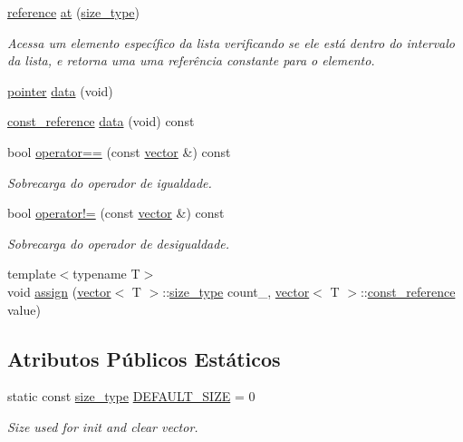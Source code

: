 \begin{DoxyCompactItemize}
\hyperlink{classsc_1_1vector_a37394c8a6b82c4a0709737d7982e32b2}{reference} \hyperlink{classsc_1_1vector_ae3f1a60bf1dac7bdf96b78e708d6e2ca}{at} (\hyperlink{classsc_1_1vector_a48bf37ba1a6d0c13504414d86e27c399}{size\+\_\+type})
\begin{DoxyCompactList}\small\item\em Acessa um elemento específico da lista verificando se ele está dentro do intervalo da lista, e retorna uma uma referência constante para o elemento. \end{DoxyCompactList}\item 
\hyperlink{classsc_1_1vector_a0348a6e1e249e051964a2bc94b05527a}{pointer} \hyperlink{classsc_1_1vector_a8c08600b61d36dd7f76c93f199fbf142}{data} (void)
\item 
\hyperlink{classsc_1_1vector_a8da2b1a11b069241100f9b2e14f481a0}{const\+\_\+reference} \hyperlink{classsc_1_1vector_a91112807482b4d0f6e13096063263eb5}{data} (void) const
\item 
bool \hyperlink{classsc_1_1vector_a14470a2d43b26c15f0f7aaeeb6ae4f04}{operator==} (const \hyperlink{classsc_1_1vector}{vector} \&) const
\begin{DoxyCompactList}\small\item\em Sobrecarga do operador de igualdade. \end{DoxyCompactList}\item 
bool \hyperlink{classsc_1_1vector_a9cf88e668b52a2a00961378d60812064}{operator!=} (const \hyperlink{classsc_1_1vector}{vector} \&) const
\begin{DoxyCompactList}\small\item\em Sobrecarga do operador de desigualdade. \end{DoxyCompactList}\item 
{\footnotesize template$<$typename T$>$ }\\void \hyperlink{classsc_1_1vector_a67d141f57f019a2ad15fa39b90369910}{assign} (\hyperlink{classsc_1_1vector}{vector}$<$ T $>$\+::\hyperlink{classsc_1_1vector_a48bf37ba1a6d0c13504414d86e27c399}{size\+\_\+type} count\+\_\+, \hyperlink{classsc_1_1vector}{vector}$<$ T $>$\+::\hyperlink{classsc_1_1vector_a8da2b1a11b069241100f9b2e14f481a0}{const\+\_\+reference} value)
\end{DoxyCompactItemize}
\subsection*{Atributos Públicos Estáticos}
\begin{DoxyCompactItemize}
\item 
static const \hyperlink{classsc_1_1vector_a48bf37ba1a6d0c13504414d86e27c399}{size\+\_\+type} \hyperlink{classsc_1_1vector_a287b97d30cd9f7540da7d5ef628e49a7}{D\+E\+F\+A\+U\+L\+T\+\_\+\+S\+I\+ZE} = 0
\begin{DoxyCompactList}\small\item\em Size used for init and clear vector. \end{DoxyCompactList}\end{DoxyCompactItemize}
